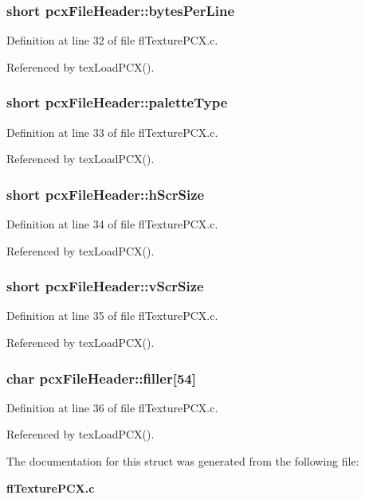 \subsubsection{\setlength{\rightskip}{0pt plus 5cm}short {\bf pcx\-File\-Header::bytes\-Per\-Line}}\label{structpcxFileHeader_504c786390a59a3983c88954e40915e4}




Definition at line 32 of file fl\-Texture\-PCX.c.

Referenced by tex\-Load\-PCX().
\subsubsection{\setlength{\rightskip}{0pt plus 5cm}short {\bf pcx\-File\-Header::palette\-Type}}\label{structpcxFileHeader_bee099b66a00a7726732fab23168def5}




Definition at line 33 of file fl\-Texture\-PCX.c.

Referenced by tex\-Load\-PCX().
\subsubsection{\setlength{\rightskip}{0pt plus 5cm}short {\bf pcx\-File\-Header::h\-Scr\-Size}}\label{structpcxFileHeader_62327d7ce840780333610fc657526175}




Definition at line 34 of file fl\-Texture\-PCX.c.

Referenced by tex\-Load\-PCX().
\subsubsection{\setlength{\rightskip}{0pt plus 5cm}short {\bf pcx\-File\-Header::v\-Scr\-Size}}\label{structpcxFileHeader_07b460699d42227fb2c4f9acde62c3fa}




Definition at line 35 of file fl\-Texture\-PCX.c.

Referenced by tex\-Load\-PCX().
\subsubsection{\setlength{\rightskip}{0pt plus 5cm}char {\bf pcx\-File\-Header::filler}[54]}\label{structpcxFileHeader_b8715380600b62b84e290a192699ae8f}




Definition at line 36 of file fl\-Texture\-PCX.c.

Referenced by tex\-Load\-PCX().

The documentation for this struct was generated from the following file:\begin{CompactItemize}
\item 
{\bf fl\-Texture\-PCX.c}\end{CompactItemize}
